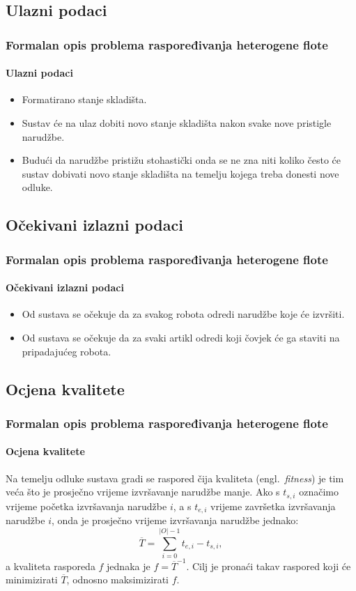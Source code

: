 \documentclass{beamer}
\newcommand{\engl}[1]{(engl.~\emph{#1})}
\begin{document}
\subsection{Ulazni podaci}
\begin{frame}
\frametitle{Formalan opis problema raspoređivanja heterogene flote}
\framesubtitle{Ulazni podaci}
\begin{itemize}
    \item Formatirano stanje skladišta.
    \item Sustav će na ulaz dobiti novo stanje skladišta nakon svake nove pristigle narudžbe.
    \item Budući da narudžbe pristižu stohastički onda se ne zna niti koliko često će sustav dobivati novo stanje skladišta na temelju kojega treba donesti nove odluke.
\end{itemize}
\end{frame}

\subsection{Očekivani izlazni podaci}
\begin{frame}
\frametitle{Formalan opis problema raspoređivanja heterogene flote}
\framesubtitle{Očekivani izlazni podaci}
\begin{itemize}
    \item Od sustava se očekuje da za svakog robota odredi narudžbe koje će izvršiti.
    \item Od sustava se očekuje da za svaki artikl odredi koji čovjek će ga staviti na pripadajućeg robota.
\end{itemize}
\end{frame}

\subsection{Ocjena kvalitete}
\begin{frame}
\frametitle{Formalan opis problema raspoređivanja heterogene flote}
\framesubtitle{Ocjena kvalitete}
Na temelju odluke sustava gradi se raspored čija kvaliteta \engl{fitness} je tim
veća što je prosječno vrijeme izvršavanje narudžbe manje. Ako s
$t_{s, i}$ označimo vrijeme početka izvršavanja narudžbe $i$, a s $t_{e, i}$
vrijeme završetka izvršavanja narudžbe $i$, onda je prosječno vrijeme izvršavanja
narudžbe jednako:
\begin{equation}
    \overline{T} = \sum_{i = 0}^{|O| - 1}{t_{e, i} - t_{s, i}},
\end{equation}
a kvaliteta rasporeda $f$ jednaka je $f = \overline{T}^{-1}$. Cilj je
pronaći takav raspored koji će minimizirati $\overline{T}$, odnosno
maksimizirati $f$.
\end{frame}
\end{document}
